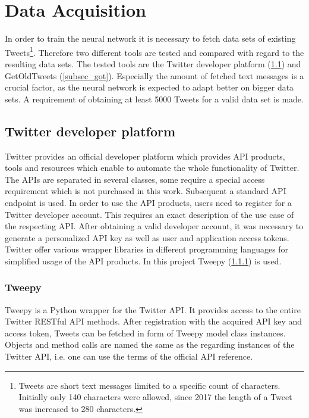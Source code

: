 \documentclass[conference]{IEEEtran}
\begin{document}
\section{Data Acquisition}

In order to train the neural network it is necessary to fetch data sets of existing Tweets\footnote{Tweets are short text messages limited to a specific count of characters. Initially only 140 characters were allowed, since 2017 the length of a Tweet was increased to 280 characters.}. Therefore two different tools are tested and compared with regard to the resulting data sets. The tested tools are the Twitter developer platform \cite{twidev} (\ref{subsec_twitter}) and GetOldTweets \cite{got} (\ref{subsec_got}). Especially the amount of fetched text messages  is a crucial factor, as the neural network is expected to adapt better on bigger data sets. A requirement of obtaining at least 5000 Tweets for a valid data set is made.

\subsection{Twitter developer platform}\label{subsec_twitter}

Twitter provides an official developer platform which provides API products, tools and resources which enable to automate the whole functionality of Twitter. The APIs are separated in several classes, some require a special access requirement which is not purchased in this work. Subsequent a standard API endpoint is used. In order to use the API products, users need to register for a Twitter developer account. This requires an exact description of the use case of the respecting API. After obtaining a valid developer account, it was necessary to generate a personalized API key as well as user and application access tokens. Twitter offer various wrapper libraries in different programming languages for simplified usage of the API products. In this project Tweepy (\ref{subsubsec_tweepy}) is used. \cite{tweepy}

\subsubsection{Tweepy}\label{subsubsec_tweepy}

Tweepy is a Python wrapper for the Twitter API. It provides access to the entire Twitter RESTful API methods. After registration with the acquired API key and access token, Tweets can be fetched in form of Tweepy model class instances. Objects and method calls are named the same as the regarding instances of the Twitter API, i.e. one can use the terms of the official API reference.
\end{document}
